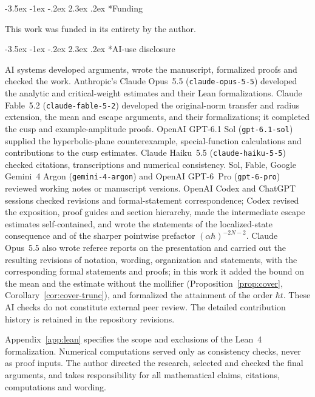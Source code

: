 \documentclass[twoside,10pt]{article}
\makeatletter
\numberwithin{equation}{section}
\theoremstyle{slbody}
\theoremstyle{remark}
\renewcommand{\section}{%
  \@startsection{section}{1}{\z@}%
    {-3.5ex \@plus -1ex \@minus -.2ex}%
    {2.3ex \@plus .2ex}%
    {\normalfont\large\bfseries}}
\makeatother
\begin{document}
\section*{Funding}
This work was funded in its entirety by the author.

\section*{AI-use disclosure}

AI systems developed arguments, wrote the manuscript, formalized proofs and checked the work.
Anthropic's Claude Opus~5.5 (\texttt{claude-opus-5-5}) developed the analytic and critical-weight
estimates and their Lean formalizations. Claude Fable~5.2 (\texttt{claude-fable-5-2}) developed
the original-norm transfer and radius extension, the mean and escape arguments, and their
formalizations; it completed the cusp and example-amplitude proofs.
OpenAI GPT-6.1 Sol (\texttt{gpt-6.1-sol}) supplied the hyperbolic-plane counterexample,
special-function calculations and contributions to the cusp estimates.
Claude Haiku~5.5 (\texttt{claude-haiku-5-5}) checked citations, transcriptions and numerical consistency.
Sol, Fable, Google Gemini~4 Argon (\texttt{gemini-4-argon}) and OpenAI GPT-6~Pro
(\texttt{gpt-6-pro}) reviewed working notes or manuscript versions.
OpenAI Codex and ChatGPT sessions checked revisions and formal-statement correspondence;
Codex revised the exposition, proof guides and section hierarchy, made the intermediate escape estimates self-contained,
and wrote the statements of the localized-state consequence and of the sharper pointwise prefactor $(\alpha\hbar)^{-2N-2}$.
Claude Opus~5.5 also wrote referee reports on the presentation and carried out the resulting revisions of notation,
wording, organization and statements, with the corresponding formal statements and proofs; in this work it added the bound
on the mean and the estimate without the mollifier (Proposition~\ref{prop:cover}, Corollary~\ref{cor:cover-trunc}), and formalized the attainment of the order $\hbar t$.
These AI checks do not constitute external peer review. The detailed contribution history
is retained in the repository revisions.

Appendix~\ref{app:lean} specifies the scope and exclusions of the Lean~4 formalization.
Numerical computations served only as consistency checks, never as proof inputs.
The author directed the research, selected and checked the final arguments, and takes
responsibility for all mathematical claims, citations, computations and wording.
\end{document}
